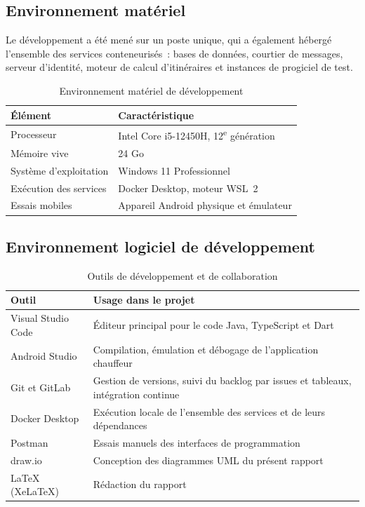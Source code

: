 \subsection{Environnement matériel}

Le développement a été mené sur un poste unique, qui a également hébergé l'ensemble des services
conteneurisés~: bases de données, courtier de messages, serveur d'identité, moteur de calcul
d'itinéraires et instances de progiciel de test.

\begin{table}[H]
\centering
\caption{Environnement matériel de développement}
\label{tab:materiel}
\begin{tabular}{L{4.5cm}L{10cm}}
\hline
{}
\textbf{Élément} & \textbf{Caractéristique} \\
\hline
Processeur & Intel Core i5-12450H, 12\textsuperscript{e} génération \\
\hline
Mémoire vive & 24 Go \\
\hline
Système d'exploitation & Windows 11 Professionnel \\
\hline
Exécution des services & Docker Desktop, moteur WSL~2 \\
\hline
Essais mobiles & Appareil Android physique et émulateur \\
\hline
\end{tabular}
\end{table}

\subsection{Environnement logiciel de développement}

\begin{table}[H]
\centering
\caption{Outils de développement et de collaboration}
\label{tab:outils}
\begin{tabular}{L{4.5cm}L{10cm}}
\hline
{}
\textbf{Outil} & \textbf{Usage dans le projet} \\
\hline
Visual Studio Code & Éditeur principal pour le code Java, TypeScript et Dart \\
\hline
Android Studio & Compilation, émulation et débogage de l'application chauffeur \\
\hline
Git et GitLab & Gestion de versions, suivi du backlog par issues et tableaux, intégration continue \\
\hline
Docker Desktop & Exécution locale de l'ensemble des services et de leurs dépendances \\
\hline
Postman & Essais manuels des interfaces de programmation \\
\hline
draw.io & Conception des diagrammes UML du présent rapport \\
\hline
\LaTeX{} (XeLaTeX) & Rédaction du rapport \\
\hline
\end{tabular}
\end{table}

